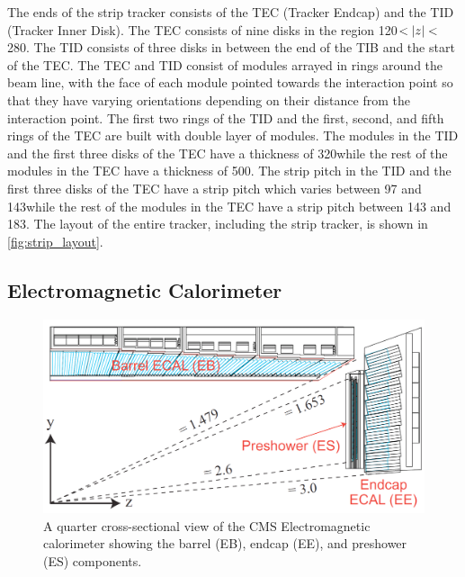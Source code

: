 The ends of the strip tracker consists of the TEC (Tracker Endcap) and the TID
(Tracker Inner Disk). The TEC consists of nine disks in the region
120\centimeters $< |z| <$ 280\centimeters. The TID consists of three
disks in between the end of the TIB and the start of the TEC. The TEC and TID
consist of modules arrayed in rings around the beam line, with the face of each
module pointed towards the interaction point so that they have varying
orientations depending on their distance from the interaction point. The first
two rings of the TID and the first, second, and fifth rings of the TEC are
built with double layer of modules. The modules in the TID and the first three
disks of the TEC have a thickness of 320\micrometers while the rest of the
modules in the TEC have a thickness of 500\micrometers. The strip pitch in the
TID and the first three disks of the TEC have a strip pitch which varies
between 97 and 143\micrometers while the rest of the modules in the TEC have a
strip pitch between 143 and 183\micrometers. The layout of the entire tracker,
including the strip tracker, is shown in \cref{fig:strip_layout}.

\subsection{Electromagnetic Calorimeter}
\label{ssec:ecal}

\begin{figure}[!htbp]
    \centering
    \includegraphics[width=\textwidth]{figures/ecal_layout.png}
    \caption[
        A quarter cross-sectional view of the CMS Electromagnetic calorimeter.
    ]{
        A quarter cross-sectional view of the CMS Electromagnetic calorimeter
        showing the barrel (EB), endcap (EE), and preshower (ES) components.
    }
    \label{fig:ecal_layout}
\end{figure}


